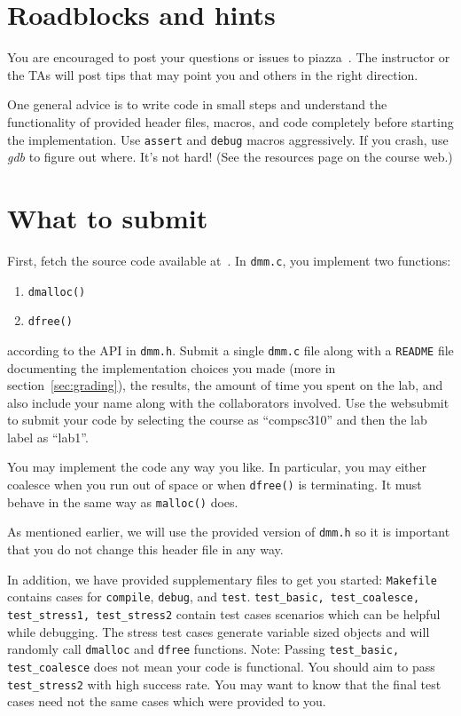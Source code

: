 \documentclass[a4paper,10pt]{article}
\newcommand{\comment}[1]{}
\begin{document}
\section{Roadblocks and hints}
You are encouraged to post your questions or issues to piazza~\cite{piazza}. 
The instructor or the TAs will post tips that may point you and others in the right direction. 

One general advice is to write code in small steps and understand the
functionality of provided header files, macros, and code completely before
starting the implementation. Use \texttt{assert} and \texttt{debug}
macros aggressively.
If you crash, use {\it gdb} to figure out where.  It's not hard!  (See
the resources page on the course web.)

\section{What to submit}
First, fetch the source code available at~\cite{lab1}. In \texttt{dmm.c},
you implement two functions:
\begin{enumerate}
 \item \texttt{dmalloc()}
 \item \texttt{dfree()}
\end{enumerate}

according to the API in \texttt{dmm.h}. Submit a single
\texttt{dmm.c} file along with a \texttt{README} file documenting the
implementation choices you made (more in section~\ref{sec:grading}), the results, the amount of time you spent on the lab, and
also include your name along with the collaborators involved. Use the websubmit
to submit your code by selecting the course
as ``compsc310'' and then the lab label as ``lab1''.

\comment{
Submission 
instructions will be announced on the course page before the deadline.


You can submit
the code using the \texttt{submit210} from any of the CS departmental
machines.
}

You may implement the code any way you like. In particular, you may either
coalesce when you run out of space or when \texttt{dfree()} is
terminating. It must behave in the same way as \texttt{malloc()} does.

As mentioned earlier, we will use the provided version of
\texttt{dmm.h} so it is important that you do not change this header
file in any way. 

In addition, we have provided supplementary files to get you started:
\texttt{Makefile} contains cases for \texttt{compile}, \texttt{debug}, and
\texttt{test}.  \texttt{test\_basic, test\_coalesce, test\_stress1,
test\_stress2} contain test cases scenarios which can be helpful while
debugging. The stress test cases generate variable sized objects and will
randomly call \texttt{dmalloc} and \texttt{dfree} functions. Note: Passing 
\texttt{test\_basic, test\_coalesce} does not mean your code is functional. 
You should aim to pass \texttt{test\_stress2} with high success rate. 
You may want to know that the final test cases need not the same
cases which were provided to you.
\end{document}
